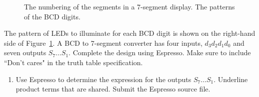 \begin{enumerate}
            \begin{figure}[ht]
                \caption{The numbering of the segments in a 7-segment display.
                The patterns of the BCD digits.}
                \label{fig:BCD}
            \end{figure}

            The pattern of LEDs to illuminate for each BCD digit is shown on the
            right-hand side of Figure~\ref{fig:BCD}.  A BCD to 7-segment converter
            has four inputs, $d_3 d_2 d_1 d_0$ and seven outputs $S_7 \ldots S_1$.
            Complete the design using Espresso.  Make sure to include ``Don't cares"
            in the truth table specification.
            \begin{enumerate}
                \item Use Espresso to determine the \SOPmin expression for the outputs
                    $S_7 \ldots S_1$.  Underline product terms that are shared.
                    Submit the Espresso source file.


\end{enumerate}
\end{enumerate}
